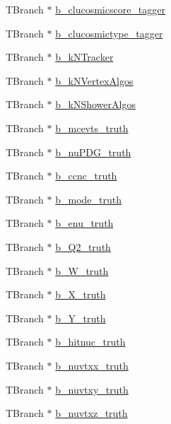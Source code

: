 \begin{DoxyCompactItemize}
\item 
T\-Branch $\ast$ \hyperlink{classanatree_a6b67c908760fa144f00052e85231ea2f}{b\-\_\-clucosmicscore\-\_\-tagger}
\item 
T\-Branch $\ast$ \hyperlink{classanatree_a6275dc9d3c86fdf0c9dbafb7671b422b}{b\-\_\-clucosmictype\-\_\-tagger}
\item 
T\-Branch $\ast$ \hyperlink{classanatree_a11fffb6adcecb18efeb0016f7fdb9a4e}{b\-\_\-k\-N\-Tracker}
\item 
T\-Branch $\ast$ \hyperlink{classanatree_afcc51723700a9295e5ab30ecf95342a1}{b\-\_\-k\-N\-Vertex\-Algos}
\item 
T\-Branch $\ast$ \hyperlink{classanatree_a4f4dabebafc8ecf9a74aadc86d06969a}{b\-\_\-k\-N\-Shower\-Algos}
\item 
T\-Branch $\ast$ \hyperlink{classanatree_af9d0e10617d6ded57b904cdf2fcd3ab1}{b\-\_\-mcevts\-\_\-truth}
\item 
T\-Branch $\ast$ \hyperlink{classanatree_a9d52ebb2157d72b322c1f54152e76d8f}{b\-\_\-nu\-P\-D\-G\-\_\-truth}
\item 
T\-Branch $\ast$ \hyperlink{classanatree_a8c271e54ceb7cb3e262cfc008580b3d7}{b\-\_\-ccnc\-\_\-truth}
\item 
T\-Branch $\ast$ \hyperlink{classanatree_a0125f3c959d85805467e858dde15a165}{b\-\_\-mode\-\_\-truth}
\item 
T\-Branch $\ast$ \hyperlink{classanatree_a0ac5659f51301d287bf9d9bbc3f50d6c}{b\-\_\-enu\-\_\-truth}
\item 
T\-Branch $\ast$ \hyperlink{classanatree_a7caf886dbc743a275fb12bba23075719}{b\-\_\-\-Q2\-\_\-truth}
\item 
T\-Branch $\ast$ \hyperlink{classanatree_a1fb7be4562a99e8c9a96aaac02eb9dbc}{b\-\_\-\-W\-\_\-truth}
\item 
T\-Branch $\ast$ \hyperlink{classanatree_a19023f687358f7ef7d6e6a81341d48c1}{b\-\_\-\-X\-\_\-truth}
\item 
T\-Branch $\ast$ \hyperlink{classanatree_aaa328ace7dd04c581ea6c12d187a07ad}{b\-\_\-\-Y\-\_\-truth}
\item 
T\-Branch $\ast$ \hyperlink{classanatree_acfd4b17208b7e08e4ee3770a09d1b19e}{b\-\_\-hitnuc\-\_\-truth}
\item 
T\-Branch $\ast$ \hyperlink{classanatree_a6f5a62dc119d648736a8c506fcfcea4a}{b\-\_\-nuvtxx\-\_\-truth}
\item 
T\-Branch $\ast$ \hyperlink{classanatree_aa7d28f6964a4ca942f27eb07b9ebe3ed}{b\-\_\-nuvtxy\-\_\-truth}
\item 
T\-Branch $\ast$ \hyperlink{classanatree_a1cbee5b82d3a4b37c1d1ad8a05440bec}{b\-\_\-nuvtxz\-\_\-truth}

\end{DoxyCompactItemize}

